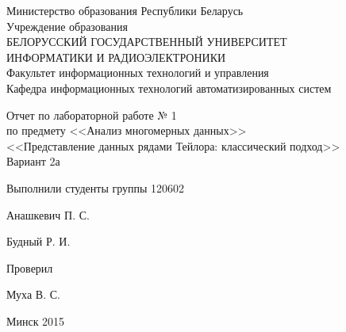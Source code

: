 \thispagestyle{empty}
\setlength{\parindent}{0ex} %

\begin{center}
  Министерство образования Республики Беларусь \\
  \vspace{0.5ex}
  Учреждение образования \\
  БЕЛОРУССКИЙ ГОСУДАРСТВЕННЫЙ УНИВЕРСИТЕТ \\
  ИНФОРМАТИКИ И РАДИОЭЛЕКТРОНИКИ \\
  \vspace{0.5ex}
  Факультет информационных технологий и управления \\
  \vspace{0.5ex}
  Кафедра информационных технологий автоматизированных систем
\end{center}

\vspace{50mm}

\begin{center}
  Отчет по лабораторной работе № 1 \\
  по предмету <<Анализ многомерных данных>> \\
  <<Представление данных рядами Тейлора: классический подход>> \\
  Вариант 2а
\end{center}

\vspace{40mm}

\begin{minipage}{.55\linewidth}
    Выполнили студенты группы 120602
    \bigskip
\end{minipage}
\hfill
\begin{minipage}{.4\linewidth}
  \begin{flushright}
    Анашкевич П. С.

    Будный Р. И.
  \end{flushright}
\end{minipage}

\vspace{10mm}

\begin{minipage}{.55\linewidth}
    Проверил
\end{minipage}
\hfill
\begin{minipage}{.4\linewidth}
  \begin{flushright}
    Муха В. С.

  \end{flushright}
\end{minipage}

\vspace{40mm}
\begin{center}
  Минск 2015
\end{center}

\setlength{\parindent}{5ex} %

\newpage
